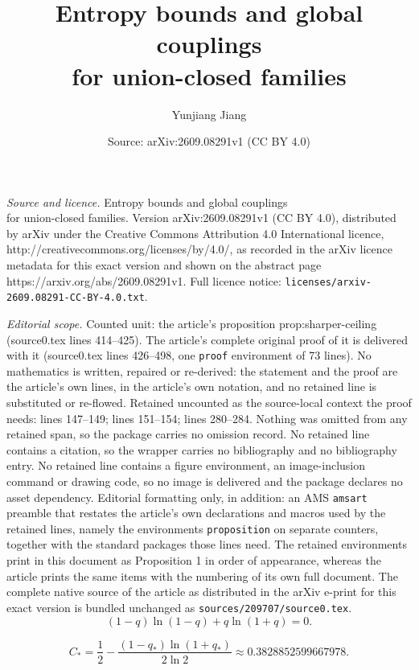 \documentclass[10pt,a4paper]{amsart}
\title{Entropy bounds and global couplings\\for union-closed families}
\author{Yunjiang Jiang}
\date{Source: arXiv:2609.08291v1 (CC BY 4.0)}
\begin{document}
\maketitle

\noindent\emph{Source and licence.} Entropy bounds and global couplings\\for union-closed families. Version arXiv:2609.08291v1 (CC BY 4.0), distributed by arXiv under the Creative Commons Attribution 4.0 International licence, http://creativecommons.org/licenses/by/4.0/, as recorded in the arXiv licence metadata for this exact version and shown on the abstract page https://arxiv.org/abs/2609.08291v1. Full licence notice: \texttt{licenses/arxiv-2609.08291-CC-BY-4.0.txt}.\par\smallskip

\noindent\textit{Editorial scope.} Counted unit: the article's proposition prop:sharper-ceiling (source0.tex lines 414--425). The article's complete original proof of it is delivered with it (source0.tex lines 426--498, one \texttt{proof} environment of 73 lines). No mathematics is written, repaired or re-derived: the statement and the proof are the article's own lines, in the article's own notation, and no retained line is substituted or re-flowed.  Retained uncounted as the source-local context the proof needs: lines 147--149; lines 151--154; lines 280--284.  Nothing was omitted from any retained span, so the package carries no omission record.  No retained line contains a citation, so the wrapper carries no bibliography and no bibliography entry.  No retained line contains a figure environment, an image-inclusion command or drawing code, so no image is delivered and the package declares no asset dependency.  Editorial formatting only, in addition: an AMS \texttt{amsart} preamble that restates the article's own declarations and macros used by the retained lines, namely the environments \texttt{proposition} on separate counters, together with the standard packages those lines need.  The retained environments print in this document as Proposition 1 in order of appearance, whereas the article prints the same items with the numbering of its own full document.  The complete native source of the article as distributed in the arXiv e-print for this exact version is bundled unchanged as \texttt{sources/209707/source0.tex}.
\begin{equation}\label{eq:stationary}
(1-q)\ln(1-q)+q\ln(1+q)=0.
\end{equation}

\begin{equation}\label{eq:constant-ceiling}
C_*=\frac12-\frac{(1-q_*)\ln(1+q_*)}{2\ln2}
\approx0.3828852599667978.
\end{equation}
\end{document}
